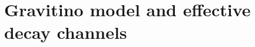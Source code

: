 \documentclass[a4paper,11pt]{article}
\newcommand*{\blue}{\textcolor{blue}}
\begin{document}



 
\section{Gravitino model and effective decay channels}
\label{gdecay}
\end{document}
